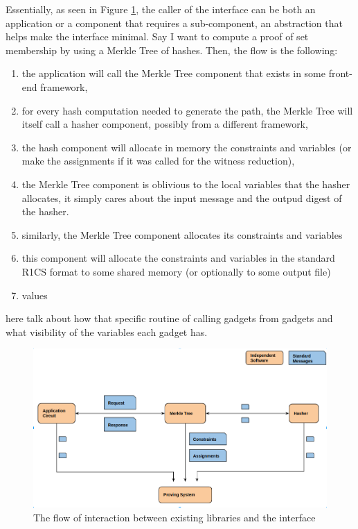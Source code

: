         Essentially, as seen in Figure \ref{flow}, the caller of the interface can be both an application or a component that requires a sub-component, an abstraction that helps make the interface minimal. Say I want to compute a proof of set membership by using a Merkle Tree of hashes. Then, the flow is the following:
        \begin{enumerate} 
            \item the application will call the Merkle Tree component that exists in some front-end framework,
            \item for every hash computation needed to generate the path, the Merkle Tree will itself call a hasher component, possibly from a different framework,
            \item the hash component will allocate in memory the constraints and variables (or make the assignments if it was called for the witness reduction),
            \item the Merkle Tree component is oblivious to the local variables that the hasher allocates, it simply cares about the input message and the outpud digest of the hasher.
            \item similarly, the Merkle Tree component allocates its constraints and variables
            \item this component will allocate the constraints and variables in the standard R1CS format to some shared memory (or optionally to some output file)
            \item values
        \end{enumerate}
        
        here talk about how that specific routine of calling gadgets from gadgets and what visibility of the variables each gadget has. 
		
			\begin{figure}[h!]
				\includegraphics[width=\linewidth]{routine.png}
				\caption{The flow of interaction between existing libraries and the interface}
				\label{flow}
			\end{figure}
		

